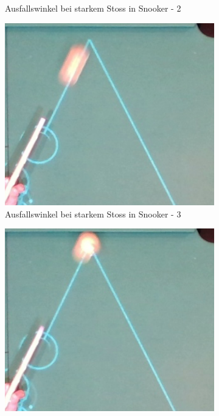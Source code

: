 \begin{figure}[h!]
\begin{subfigure}[t]{0.2\textwidth}
        \caption{Ausfallswinkel bei starkem Stoss in Snooker - 2}
        \label{fig:rebound_angle_fast_snooker_2}
    \end{subfigure}
    \hfill
    \begin{subfigure}[t]{0.2\textwidth}
        \centering
        \includegraphics[width=1.0\linewidth]{../common/04_results/resources/simulation/rebound_angle_fast_snooker/00_rail_rebound_angle_fast_snooker_03.png}
        \caption{Ausfallswinkel bei starkem Stoss in Snooker - 3}
        \label{fig:rebound_angle_fast_snooker_3}
    \end{subfigure}
    \hfill
    \begin{subfigure}[t]{0.2\textwidth}
        \centering
        \includegraphics[width=1.0\linewidth]{../common/04_results/resources/simulation/rebound_angle_fast_snooker/00_rail_rebound_angle_fast_snooker_04.png}

\end{subfigure}
\end{figure}
